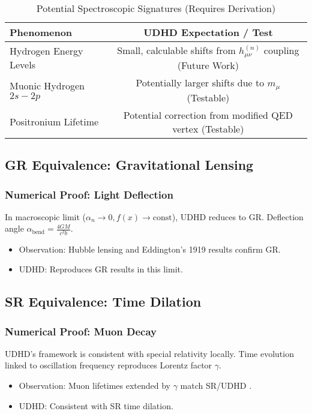 \documentclass[12pt, a4paper]{article} %
\begin{document}
\begin{table}[h!]
    \centering
    \caption{Potential Spectroscopic Signatures (Requires Derivation)}
    \label{tab:spectroscopy_final_sec4_final_full_revised_new_table_ultra}
    \begin{tabular}{lc}
        \toprule
        Phenomenon & UDHD Expectation / Test \\
        \midrule
        Hydrogen Energy Levels & Small, calculable shifts from \(h_{\mu\nu}^{(n)}\) coupling (Future Work) \\
        Muonic Hydrogen \(2s-2p\) & Potentially larger shifts due to \(m_\mu\) (Testable) \\
        Positronium Lifetime & Potential correction from modified QED vertex (Testable) \\
        \bottomrule
    \end{tabular}
\end{table}

\subsection{GR Equivalence: Gravitational Lensing}
\subsubsection*{Numerical Proof: Light Deflection}
In macroscopic limit (\(\alpha_n \to 0, f(x) \to \text{const}\)), UDHD reduces to GR. Deflection angle \( \alpha_{\text{bend}} = \frac{4GM}{c^2 b} \).
\begin{itemize}
    \item Observation: Hubble lensing \cite{placeholder_hubble_lensing} and Eddington's 1919 results \cite{dyson1920determination} confirm GR.
    \item UDHD: Reproduces GR results in this limit.
\end{itemize}

\subsection{SR Equivalence: Time Dilation}
\subsubsection*{Numerical Proof: Muon Decay}
UDHD's framework is consistent with special relativity locally. Time evolution linked to oscillation frequency reproduces Lorentz factor \( \gamma \).
\begin{itemize}
    \item Observation: Muon lifetimes extended by \(\gamma\) match SR/UDHD \cite{rossi1941variation, frisch1963measurement}.
    \item UDHD: Consistent with SR time dilation.
\end{itemize}
\end{document}
